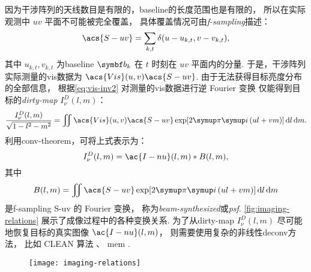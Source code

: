 因为干涉阵列的天线数目是有限的，\ac{baseline}的长度范围也是有限的，
所以在实际观测中 $uv$ 平面不可能被完全覆盖，
具体覆盖情况可由\emph{\acf{f-sampling}}描述：
\begin{equation}
  \label{eq:sf}
  \acs{S-uv} = \sum_{k,t} \delta(u - u_{k,t}, v - v_{k,t}),
\end{equation}
其中 $u_{k,t}, v_{k,t}$ 为\ac{baseline} $\B{b}_k$ 在 $t$ 时刻在 $uv$ 平面内的分量.
于是，干涉阵列实际测量的\ac{vis}数据为 $\acs{Vis}(u,v) \acs{S-uv}$.
由于无法获得目标亮度分布的全部信息，
根据\autoref{eq:vis-inv2} 对测量的\ac{vis}数据进行逆 Fourier 变换
仅能得到目标的\emph{\acf{dirty-map}} $I_{\nu}^D(l,m)$：
\begin{equation}
  \label{eq:dirty-map}
  \frac{I_{\nu}^D(l,m)}{\sqrt{1-l^2-m^2}} = \iint
    \acs{Vis}(u,v) \acs{S-uv} \exp [2\Cpi\Ci\, (ul+vm)] \,\D{l}\,\D{m}.
\end{equation}
利用\ac{conv-theorem}，可将上式表示为：
\begin{equation}
  I_{\nu}^D(l,m) = \ac{I-nu}(l,m) * B(l,m),
\end{equation}
其中
\begin{equation}
  \label{eq:syn-beam}
  B(l,m) = \iint \acs{S-uv} \exp [2\Cpi\Ci\, (ul+vm)] \,\D{l}\,\D{m}
\end{equation}
是\ac{f-sampling} \acs{S-uv} 的 Fourier 变换，
称为\emph{\acf{beam-synthesized}}或\emph{\acf{psf}}.
\autoref{fig:imaging-relations} 展示了成像过程中的各种变换关系.
为了从\ac{dirty-map} $I_{\nu}^D(l,m)$ 尽可能地恢复目标的真实图像 $\ac{I-nu}(l,m)$，
则需要使用复杂的非线性\ac{deconv}方法，
比如 CLEAN 算法 \cite{hogbom1974,cornwell1999}、
\ac{mem} \cite{narayan1986}.

\begin{figure}[htp]
  \centering
  \texttt{[image: imaging-relations]}
  \label{fig:imaging-relations}
\end{figure}

